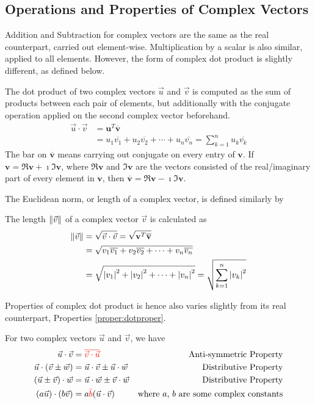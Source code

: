\subsection{Operations and Properties of Complex Vectors}
Addition and Subtraction for complex vectors are the same as the real counterpart, carried out element-wise. Multiplication by a scalar is also similar, applied to all elements. However, the form of complex dot product is slightly different, as defined below.
\begin{defn}
\label{defn:complexdotproduct}
The dot product of two complex vectors $\vec{u}$ and $\vec{v}$ is computed as the sum of products between each pair of elements, but additionally with the conjugate operation applied on the second complex vector beforehand.
\begin{align*}
\vec{u} \cdot \vec{v} &= \textbf{u}^T \overline{\textbf{v}} \\
&= u_1\overline{v_1} + u_2\overline{v_2} + \cdots + u_n\overline{v_n} = \sum_{k=1}^{n} u_k\overline{v_k}
\end{align*}
The bar on $\overline{\textbf{v}}$ means carrying out conjugate on every entry of $\textbf{v}$. If $\textbf{v} = \Re{\textbf{v}} + \imath \Im{\textbf{v}}$, where $\Re{\textbf{v}}$ and $\Im{\textbf{v}}$ are the vectors consisted of the real/imaginary part of every element in $\textbf{v}$, then $\overline{\textbf{v}} = \Re{\textbf{v}} - \imath \Im{\textbf{v}}$.
\end{defn}
The Euclidean norm, or length of a complex vector, is defined similarly by
\begin{defn}
The length $\norm{\vec{v}}$ of a complex vector $\vec{v}$ is calculated as
\begin{align*}
\norm{\vec{v}} &= \sqrt{\vec{v} \cdot \vec{v}} = \sqrt{\textbf{v}^T \overline{\textbf{v}}}\\
&= \sqrt{v_1\overline{v_1} + v_2\overline{v_2} + \cdots + v_n\overline{v_n}} \\
&= \sqrt{\abs{v_1}^2 + \abs{v_2}^2 + \cdots + \abs{v_n}^2} = \sqrt{\sum_{k=1}^{n} \abs{v_k}^2}
\end{align*}
\end{defn}
Properties of complex dot product is hence also varies slightly from its real counterpart, Properties \ref{proper:dotproper}.
\begin{proper}
For two complex vectors $\vec{u}$ and $\vec{v}$, we have
\begin{align*}
\vec{u} \cdot \vec{v} &= \textcolor{red}{\overline{\vec{v} \cdot \vec{u}}} &\text{Anti-symmetric Property} \\
\vec{u} \cdot (\vec{v} \pm \vec{w}) &= \vec{u} \cdot \vec{v} \pm \vec{u} \cdot \vec{w} &\text{Distributive Property} \\
(\vec{u} \pm \vec{v}) \cdot \vec{w} &= \vec{u} \cdot \vec{w} \pm \vec{v} \cdot \vec{w} &\text{Distributive Property} \\
(a\vec{u}) \cdot (b\vec{v}) &= a\textcolor{red}{\bar{b}}(\vec{u} \cdot \vec{v}) &\text{where $a$, $b$ are some complex constants}    
\end{align*}
\end{proper}
